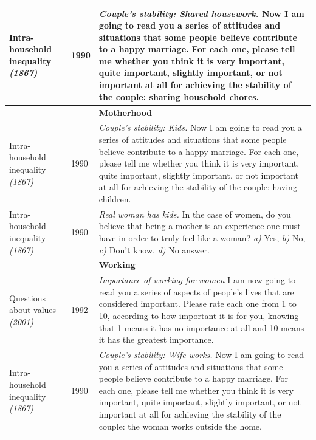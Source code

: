 \documentclass[a4paper,oneside,final,onecolumn,12pt,english]{article}
\begin{document}
\begin{longtable}{p{} p{} p{} }
                             
Intra-household inequality  \textit{(1867)}  &   1990&    \textit{Couple's stability: Shared housework.} Now I am going to read you a series of attitudes and situations that some people believe contribute to a happy marriage. For each one, please tell me whether you think it is very important, quite important, slightly important, or not important at all for achieving the stability of the couple: sharing household chores.   \\ \hline 

&&\textbf{Motherhood}\\ \hline
Intra-household inequality  \textit{(1867)}  & 1990 & \textit{Couple's stability: Kids.}  Now I am going to read you a series of attitudes and situations that some people believe contribute to a happy marriage. For each one, please tell me whether you think it is very important, quite important, slightly important, or not important at all for achieving the stability of the couple: having children. \\ \hline   

Intra-household inequality  \textit{(1867)}  & 1990&   \textit{Real woman has kids.} In the case of women, do you believe that being a mother is an experience one must have in order to truly feel like a woman? \textit{a)} Yes, \textit{b)} No, \textit{c)} Don't know, \textit{d)} No answer. \\ \hline 

 &&\textbf{Working}\\ \hline
 Questions about values \textit{(2001)}  & 1992&   \textit{Importance of working for women}  I am now going to read you a series of aspects of people’s lives that are considered important. Please rate each one from 1 to 10, according to how important it is for you, knowing that 1 means it has no importance at all and 10 means it has the greatest importance. \\ \hline    
 
 Intra-household inequality  \textit{(1867)}  & 1990&   \textit{Couple's stability: Wife works.} Now I am going to read you a series of attitudes and situations that some people believe contribute to a happy marriage. For each one, please tell me whether you think it is very important, quite important, slightly important, or not important at all for achieving the stability of the couple: the woman works outside the home. \\ \hline 
 

\end{longtable}
\end{document}
